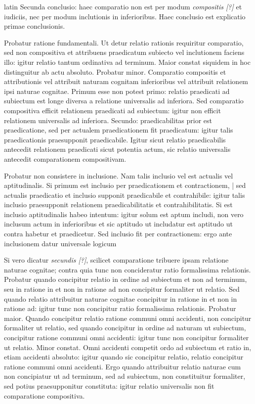 \begin{otherlanguage*}{latin}
\pstart
  Secunda conclusio: haec comparatio non est per modum \emph{compositis [?]} et iudiciis, nec per modum inclutionis in inferioribus. Haec conclusio est explicatio primae conclusionis. 
\pend

\pstart
  Probatur ratione fundamentali. Ut detur relatio rationis requiritur comparatio, sed non compositiva et attribuens praedicatum subiecto vel inclutionem faciens  illo: igitur relatio tantum ordinativa ad terminum. Maior constat siquidem in hoc distinguitur ab actu absoluto. Probatur minor. Comparatio compositis et attributionis vel attribuit naturam cognitam inferioribus vel attribuit relationem ipsi naturae cognitae. Primum esse non potest primo: relatio praedicati ad subiectum est longe diversa a relatione universalis ad inferiora. Sed comparatio compositiva efficit relationem praedicati ad subiectum: igitur non efficit relationem universalis ad inferiora. Secundo: praedicabilitas prior est praedicatione, sed per actualem praedicationem fit praedicatum: igitur talis praedicationis praesupponit praedicabile. Igitur sicut relatio praedicabilis antecedit relationem praedicati sicut potentia actum, sic relatio universalis antecedit comparationem compositivam. 
\pend

\pstart
  Probatur non consistere in inclusione. Nam talis inclusio vel est actualis vel aptitudinalis. Si primum est inclusio per praedicationem et contractionem, \textnormal{|}   sed actualis praedicatio et inclusio supponit praedicabile et contrahibile: igitur talis inclusio praesupponit relationem praedicabilitatis et contrahibilitatis. Si est inclusio aptitudinalis habeo intentum: igitur solum est aptum includi, non vero inclusum actum in inferioribus et sic aptitudo ut includatur est aptitudo ut contra habetur et praedicetur. Sed inclusio fit per contractionem: ergo ante inclusionem datur universale logicum 
\pend

\pstart
  Si vero dicatur \emph{secundis [?]}, scilicet comparatione tribuere ipsam relatione naturae cognitae; contra quia tunc non concideratur ratio formalissima relationis. Probatur quando concipitur relatio in ordine ad subiectum et non ad terminum, seu in ratione in et non in ratione ad non concipitur formaliter ut relatio. Sed quando relatio attribuitur naturae cognitae concipitur in ratione in et non in ratione ad: igitur tunc non concipitur ratio formalissima relationis. Probatur maior. Quando concipitur relatio ratione communi omni accidenti, non concipitur formaliter ut relatio, sed quando concipitur in ordine ad naturam ut subiectum, concipitur ratione communi omni accidenti: igitur tunc non concipitur formaliter ut relatio. Minor constat. Omni accidenti competit ordo ad subiectum et ratio in, etiam accidenti absoluto: igitur quando sic concipitur relatio, relatio concipitur ratione communi omni accidenti. Ergo quando attribuitur relatio naturae cum non concipiatur ut ad terminum, sed ad subiectum, non constituitur formaliter, sed potius praesupponitur constituta: igitur relatio universalis non fit comparatione compositiva. 
\pend


\end{otherlanguage*}
